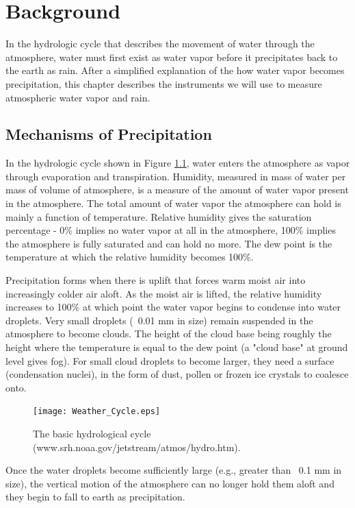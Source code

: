 \documentclass[proposal]{umassthesis}
\begin{document}
\chapter{Background}

In the hydrologic cycle that describes the movement of water through the atmosphere, water must first exist as water vapor before it precipitates back to the earth as rain. After a simplified explanation of the how water vapor becomes precipitation, this chapter describes the instruments we will use to measure atmospheric water vapor and rain.

\section{Mechanisms of Precipitation}

In the hydrologic cycle shown in Figure \ref{fig:weather_cycle}, water enters the atmosphere as vapor through evaporation and transpiration. Humidity, measured in mass of water per mass of volume of atmosphere, is a measure of the amount of water vapor present in the atmosphere. The total amount of water vapor the atmosphere can hold is mainly a function of temperature. Relative humidity gives the saturation percentage - 0\% implies no water vapor at all in the atmosphere, 100\% implies the atmosphere is fully saturated and can hold no more. The dew point is the temperature at which the relative humidity becomes 100\%.

Precipitation forms when there is uplift that forces warm moist air into increasingly colder air aloft. As the moist air is lifted, the relative humidity increases to 100\% at which point the water vapor begins to condense into water droplets. Very small droplets (~0.01 mm in size) remain suspended in the atmosphere to become clouds. The height of the cloud base being roughly the height where the temperature is equal to the dew point (a "cloud base" at ground level gives fog). For small cloud droplets to become larger, they need a surface (condensation nuclei), in the form of dust, pollen or frozen ice crystals to coalesce onto.
\begin{figure}[!t]
\begin{center}
\texttt{[image: Weather\_Cycle.eps]}
\caption{The basic hydrological cycle (www.srh.noaa.gov/jetstream/atmos/hydro.htm).}
\label{fig:weather_cycle}
\end{center}
\end{figure}
Once the water droplets become sufficiently large (e.g., greater than ~0.1 mm in size), the vertical motion of the atmosphere can no longer hold them aloft and they begin to fall to earth as precipitation.
\end{document}

